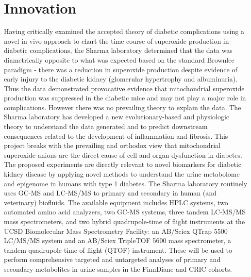 \documentclass[arial,11pt]{article}
\begin{document}
\section{Innovation}


Having critically examined the accepted theory of diabetic complications using a novel in vivo approach to chart the time course of superoxide production in diabetic complications, the Sharma laboratory determined that the data was diametrically opposite to what was expected based on the standard Brownlee paradigm - there was a reduction in superoxide production despite evidence of early injury to the diabetic kidney (glomerular hypertrophy and albuminuria). Thus the data demonstrated provocative evidence that mitochondrial superoxide production was suppressed in the diabetic mice and may not play a major role in complications. However there was no prevailing theory to explain the data. The Sharma laboratory has developed a new evolutionary-based and physiologic theory to understand the data generated and to predict downstream consequences related to the development of inflammation and fibrosis. This project breaks with the prevailing and orthodox view that mitochondrial superoxide anions are the direct cause of cell and organ dysfunction in diabetes. The proposed experiments are directly relevant to novel biomarkers for diabetic kidney disease by applying novel methods to understand the urine metabolome and epigenome in humans with type 1 diabetes. The Sharma laboratory routinely uses GC-MS and LC-MS/MS to primary and secondary in human (and veterinary) biofluids. The available equipment includes HPLC systems, two automated amino acid analyzers, two GC-MS systems, three tandem LC-MS/MS mass spectrometers, and two hybrid quadrupole-time of flight instruments at the UCSD Biomolecular Mass Spectrometry Facility: an AB/Sciex QTrap 5500 LC/MS/MS system and an AB/Sciex TripleTOF 5600 mass spectrometer, a tandem quadrupole time of flight (QTOF) instrument. These will be used to perform comprehensive targeted and untargeted analyses of primary and secondary metabolites in urine samples in the FinnDiane and CRIC cohorts.
\end{document}

